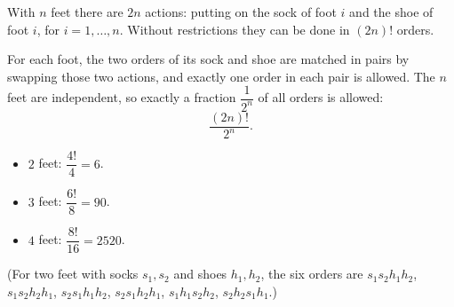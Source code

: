 With $n$ feet there are $2n$ actions: putting on the sock of foot $i$ and the shoe of foot $i$, for $i=1,\dots,n$. Without restrictions they can be done in $(2n)!$ orders.

For each foot, the two orders of its sock and shoe are matched in pairs by swapping those two actions, and exactly one order in each pair is allowed. The $n$ feet are independent, so exactly a fraction $\dfrac{1}{2^n}$ of all orders is allowed:
\[
\dfrac{(2n)!}{2^n}.
\]
\begin{itemize}
\item $2$ feet: $\dfrac{4!}{4}=\boxed{6}$.
\item $3$ feet: $\dfrac{6!}{8}=\boxed{90}$.
\item $4$ feet: $\dfrac{8!}{16}=\boxed{2520}$.
\end{itemize}
(For two feet with socks $s_1,s_2$ and shoes $h_1,h_2$, the six orders are $s_1s_2h_1h_2$, $s_1s_2h_2h_1$, $s_2s_1h_1h_2$, $s_2s_1h_2h_1$, $s_1h_1s_2h_2$, $s_2h_2s_1h_1$.)
